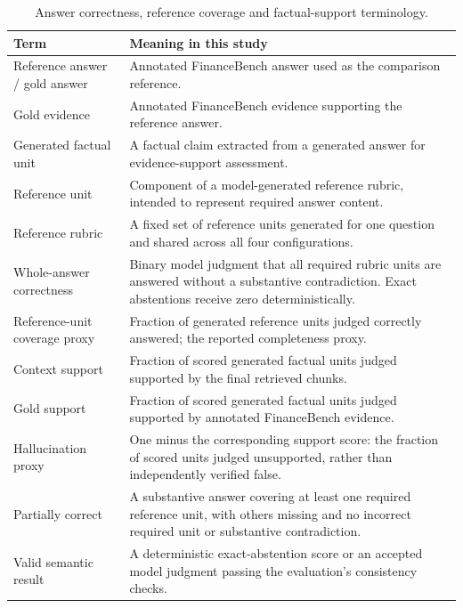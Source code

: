 \begin{table}[H]
\centering
\caption{Answer correctness, reference coverage and factual-support terminology.}
\label{tab:answer-quality-terminology}
{\small
\renewcommand{\arraystretch}{1.08}
\begin{tabular}{|p{}|p{}|}
\hline
\textbf{Term} & \textbf{Meaning in this study} \\
\hline
Reference answer / gold answer & Annotated FinanceBench answer used as the comparison reference. \\
Gold evidence & Annotated FinanceBench evidence supporting the reference answer. \\
Generated factual unit & A factual claim extracted from a generated answer for evidence-support assessment. \\
Reference unit & Component of a model-generated reference rubric, intended to represent required answer content. \\
Reference rubric & A fixed set of reference units generated for one question and shared across all four configurations. \\
Whole-answer correctness & Binary model judgment that all required rubric units are answered without a substantive contradiction. Exact abstentions receive zero deterministically. \\
Reference-unit coverage proxy & Fraction of generated reference units judged correctly answered; the reported completeness proxy. \\
Context support & Fraction of scored generated factual units judged supported by the final retrieved chunks. \\
Gold support & Fraction of scored generated factual units judged supported by annotated FinanceBench evidence. \\
Hallucination proxy & One minus the corresponding support score: the fraction of scored units judged unsupported, rather than independently verified false. \\
Partially correct & A substantive answer covering at least one required reference unit, with others missing and no incorrect required unit or substantive contradiction. \\
Valid semantic result & A deterministic exact-abstention score or an accepted model judgment passing the evaluation's consistency checks. \\
\hline
\end{tabular}%
}
\end{table}

